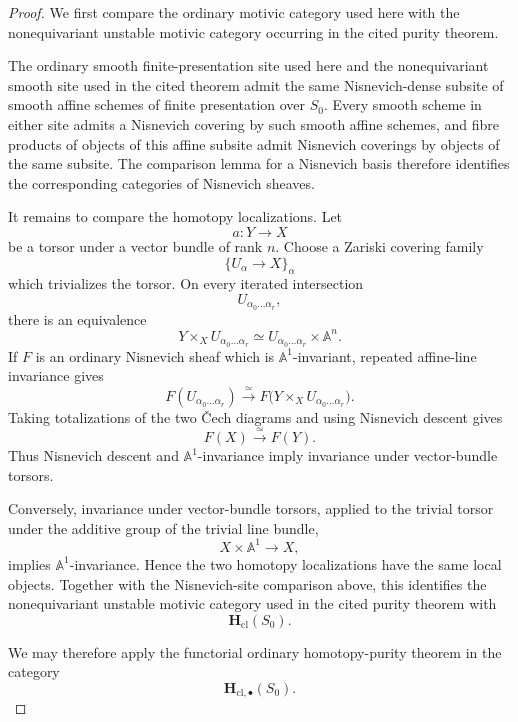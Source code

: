 \begin{proof}
We first compare the ordinary motivic category used here with the
nonequivariant unstable motivic category occurring in the cited purity
theorem.

The ordinary smooth finite-presentation site used here and the
nonequivariant smooth site used in the cited theorem admit the same
Nisnevich-dense subsite of smooth affine schemes of finite presentation
over \(S_0\).  Every smooth scheme in either site admits a Nisnevich
covering by such smooth affine schemes, and fibre products of objects
of this affine subsite admit Nisnevich coverings by objects of the same
subsite.  The comparison lemma for a Nisnevich basis therefore
identifies the corresponding categories of Nisnevich sheaves.

It remains to compare the homotopy localizations.  Let
\[
    a
    \colon
    Y
    \longrightarrow
    X
\]
be a torsor under a vector bundle of rank \(n\).  Choose a Zariski
covering family
\[
    \{U_\alpha\to X\}_\alpha
\]
which trivializes the torsor.  On every iterated intersection
\[
    U_{\alpha_0\ldots\alpha_r},
\]
there is an equivalence
\[
    Y\times_XU_{\alpha_0\ldots\alpha_r}
    \simeq
    U_{\alpha_0\ldots\alpha_r}
    \times
    \mathbb A^n.
\]
If \(F\) is an ordinary Nisnevich sheaf which is
\(\mathbb A^1\)-invariant, repeated affine-line invariance gives
\[
    F(U_{\alpha_0\ldots\alpha_r})
    \xrightarrow{\simeq}
    F
    \bigl(
        Y\times_XU_{\alpha_0\ldots\alpha_r}
    \bigr).
\]
Taking totalizations of the two Čech diagrams and using Nisnevich
descent gives
\[
    F(X)
    \xrightarrow{\simeq}
    F(Y).
\]
Thus Nisnevich descent and \(\mathbb A^1\)-invariance imply invariance
under vector-bundle torsors.

Conversely, invariance under vector-bundle torsors, applied to the
trivial torsor under the additive group of the trivial line bundle,
\[
    X\times\mathbb A^1
    \longrightarrow
    X,
\]
implies \(\mathbb A^1\)-invariance.  Hence the two homotopy
localizations have the same local objects.  Together with the
Nisnevich-site comparison above, this identifies the nonequivariant
unstable motivic category used in the cited purity theorem with
\[
    \mathbf H_{\mathrm{cl}}(S_0).
\]

We may therefore apply the functorial ordinary homotopy-purity theorem
\cite[Theorem~3.23 and the discussion following it]
{HoyoisSixOperations}
in the category
\[
    \mathbf H_{\mathrm{cl},\bullet}(S_0).
\]


\end{proof}
